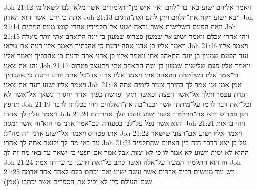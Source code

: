 Joh 21:12  ויאמר אליהם ישוע באו ברו־לחם ואין איש מן־התלמידים אשר מלאו לבו לשאל מי אתה כי ידעו אשר הוא האדון׃
Joh 21:13  ויבא ישוע ויקח את־הלחם ויתן להם ואת־הדגים׃
Joh 21:14  וזאת הפעם השלישית אשר־נראה ישוע אל־תלמידיו אחרי קומו מעם המתים׃
Joh 21:15  ויהי אחרי אכלם ויאמר ישוע אל־שמעון פטרוס שמעון בן־יונה התאהב אתי יותר מאלה ויאמר אליו כן אדני אתה ידעת כי אהבתיך ויאמר אליו רעה את־טלאי׃
Joh 21:16  ויאמר אליו עוד הפעם שמעון בן־יונה התאהב אתי ויאמר אליו כן אדני אתה ידעת כי אהבתיך ויאמר אליו נהג את־צאני׃
Joh 21:17  ויאמר אליו פעם שלישית שמעון בן־יונה התאהב אתי ויתעצב פטרוס כי־אמר אליו בשלישית התאהב אתי ויאמר אליו אדני את־כל אתה יודע וידעת כי אהבתיך ויאמר אליו ישוע רעה את־צאני׃
Joh 21:18  אמן אמן אני אמר לך בהיתך צעיר לימים אתה חגרת עצמך ותלך אל־אשר חפצת וכאשר תזקן ופרשת כפיך ואחר יחגרך ונשאך אל־אשר לא תחפץ׃
Joh 21:19  וכל־זאת דבר לרמז על־מיתתו אשר יכבד־בה את־האלהים ויהי ככלותו לדבר ויאמר אליו לך אחרי׃
Joh 21:20  ויפן פטרוס וירא את־התלמיד אשר ישוע אהבו הלך אחריהם והוא אשר נפל על־לבו בסעודה וגם־אמר אדני מי הוא־זה אשר ימסר׃
Joh 21:21  ויהי בראות אתו פטרוס ויאמר אל־ישוע אדני וזה מה־לו׃
Joh 21:22  ויאמר אליו ישוע אם־רצוני שישאר עד־באי מה־לך ולזאת אתה לך אחרי׃
Joh 21:23  על־כן יצא הדבר הזה בין האחים שהתלמיד ההוא לא ימות וישוע לא אמר־לו כי לא־ימות אבל אמר אם־חפצי כי־ישאר עד־באי מה־זה לך׃
Joh 21:24  זה הוא התלמיד המעיד על־אלה ואשר כתב כל־זאת וידענו כי עדותו אמת׃
Joh 21:25  ויש עוד מעשים רבים אחרים אשר עשה ישוע ואם־יכתבו כלם לאחד אחד אדמה שגם־העולם כלו לא יכיל את־הספרים אשר יכתבו (אמן)׃


